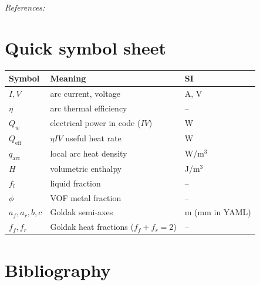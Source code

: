 \documentclass[11pt,a4paper]{article}
\newcommand{\fref}[1]{\par\smallskip\noindent\textit{References:} #1\par}
\begin{document}
\begin{center}
\end{center}

\fref{\cite{waam_twin2025,Voller1987,Brackbill1992,Guo2002}}

\section{Quick symbol sheet}

\begin{center}
\begin{tabular}{@{}lll@{}}
\toprule
Symbol & Meaning & SI \\
\midrule
$I,V$ & arc current, voltage & A, V \\
$\eta$ & arc thermal efficiency & -- \\
$Q_w$ & electrical power in code ($IV$) & W \\
$Q_{\mathrm{eff}}$ & $\eta IV$ useful heat rate & W \\
$\dot{q}_{\mathrm{arc}}$ & local arc heat density & W/m$^3$ \\
$H$ & volumetric enthalpy & J/m$^3$ \\
$f_l$ & liquid fraction & -- \\
$\phi$ & VOF metal fraction & -- \\
$a_f,a_r,b,c$ & Goldak semi-axes & m (mm in YAML) \\
$f_f,f_r$ & Goldak heat fractions ($f_f+f_r=2$) & -- \\
\bottomrule
\end{tabular}
\end{center}

\section{Bibliography}
\end{document}
